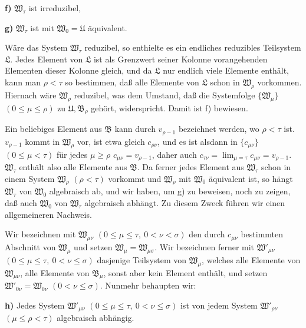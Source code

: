 \textbf{f)} \(\mathfrak W_\tau\) ist irreduzibel,

\textbf{g)} \(\mathfrak W_\tau\) ist mit \(\mathfrak W_0=\mathfrak U\) äquivalent.

Wäre das System \(\mathfrak W_\tau\) reduzibel, so enthielte es ein endliches reduzibles Teilsystem \(\mathfrak L\). Jedes Element von \(\mathfrak L\) ist als Grenzwert seiner Kolonne vorangehenden Elementen dieser Kolonne gleich, und da \(\mathfrak L\) nur endlich viele Elemente enthält, kann man \(\rho<\tau\) so bestimmen, daß alle Elemente von \(\mathfrak L\) schon in \(\mathfrak W_\rho\) vorkommen. Hiernach wäre \(\mathfrak W_\rho\) reduzibel, was dem Umstand, daß die Systemfolge \(\{\mathfrak W_\mu\}\) \((0\leq\mu\leq\rho)\) zu \(\mathfrak U,\mathfrak B_\rho\) gehört, widerspricht. Damit ist f) bewiesen.

Ein beliebiges Element aus \(\mathfrak B\) kann durch \(v_{\rho-1}\) bezeichnet werden, wo \(\rho<\tau\) ist. \(v_{\rho-1}\) kommt in \(\mathfrak W_\rho\) vor, ist etwa gleich \(c_{\rho\nu}\), und es ist alsdann in \(\{c_{\mu\nu}\}\) \((0\leq\mu<\tau)\) für jedes \(\mu\geq\rho\) \(c_{\mu\nu}=v_{\rho-1}\), daher auch \(c_{\tau\nu}=\lim_{\mu=\tau}c_{\mu\nu}=v_{\rho-1}\). \(\mathfrak W_\tau\) enthält also alle Elemente aus \(\mathfrak B\). Da ferner jedes Element aus \(\mathfrak W_\tau\) schon in einem System \(\mathfrak W_\rho\) \((\rho<\tau)\) vorkommt und \(\mathfrak W_\rho\) mit \(\mathfrak W_0\) äquivalent ist, so hängt \(\mathfrak W_\tau\) von \(\mathfrak W_0\) algebraisch ab, und wir haben, um g) zu beweisen, noch zu zeigen, daß auch \(\mathfrak W_0\) von \(\mathfrak W_\tau\) algebraisch abhängt. Zu diesem Zweck führen wir einen allgemeineren Nachweis.

Wir bezeichnen mit \(\mathfrak W_{\mu\nu}\) \((0\leq\mu\leq\tau,\ 0<\nu<\sigma)\) den durch \(c_{\mu\nu}\) bestimmten Abschnitt von \(\mathfrak W_\mu\) und setzen \(\mathfrak W_\mu=\mathfrak W_{\mu\sigma}\). Wir bezeichnen ferner mit \(\mathfrak W'_{\mu\nu}\) \((0\leq\mu\leq\tau,\ 0<\nu\leq\sigma)\) dasjenige Teilsystem von \(\mathfrak W_\mu\), welches alle Elemente von \(\mathfrak W_{\mu\nu}\), alle Elemente von \(\mathfrak B_\mu\), sonst aber kein Element enthält, und setzen \(\mathfrak W'_{0\nu}=\mathfrak W_{0\nu}\) \((0<\nu\leq\sigma)\). Nunmehr behaupten wir:

\textbf{h)} Jedes System \(\mathfrak W'_{\mu\nu}\) \((0\leq\mu\leq\tau,\ 0<\nu\leq\sigma)\) ist von jedem System \(\mathfrak W'_{\rho\nu}\) \((\mu\leq\rho<\tau)\) algebraisch abhängig.

